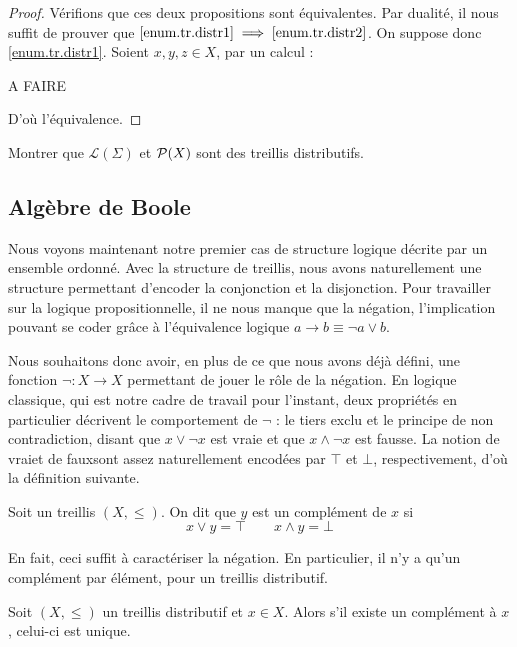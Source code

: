 \begin{proof}
  Vérifions que ces deux propositions sont équivalentes. Par dualité, il nous
  suffit de prouver que $\ref{enum.tr.distr1} \implies\ref{enum.tr.distr2}$.
  On suppose donc \ref{enum.tr.distr1}. Soient $x,y,z\in X$, par un calcul :

  A FAIRE

  D'où l'équivalence.
\end{proof}

\begin{exercise}
  Montrer que $\mathcal L(\Sigma)$ et $\mathcal{P}(X)$ sont des treillis
  distributifs.
\end{exercise}

\subsection{Algèbre de Boole}

Nous voyons maintenant notre premier cas de structure logique décrite par un
ensemble ordonné. Avec la structure de treillis, nous avons naturellement une
structure permettant d'encoder la conjonction et la disjonction. Pour travailler
sur la logique propositionnelle, il ne nous manque que la négation, l'implication
pouvant se coder grâce à l'équivalence logique $a\to b \equiv \lnot a \lor b$.

Nous souhaitons donc avoir, en plus de ce que nous avons déjà défini, une
fonction $\lnot : X \to X$ permettant de jouer le rôle de la négation. En logique
classique, qui est notre cadre de travail pour l'instant, deux propriétés
en particulier décrivent le comportement de $\lnot$ : le tiers exclu et le
principe de non contradiction, disant que $x\lor \lnot x$ est vraie et que
$x\land \lnot x$ est fausse. La notion de \og vrai\fg et de \og faux\fg sont
assez naturellement encodées par $\top$ et $\bot$, respectivement, d'où la
définition suivante.

\begin{definition}[Complément]
  Soit un treillis $(X,\leq)$. On dit que $y$ est un complément de $x$ si
  \[x\lor y = \top \qquad x \land y = \bot\]
\end{definition}

En fait, ceci suffit à caractériser la négation. En particulier, il n'y a qu'un
complément par élément, pour un treillis distributif.

\begin{proposition}
  Soit $(X,\leq)$ un treillis distributif et $x\in X$. Alors s'il existe un
  complément à $x$, celui-ci est unique.
\end{proposition}

